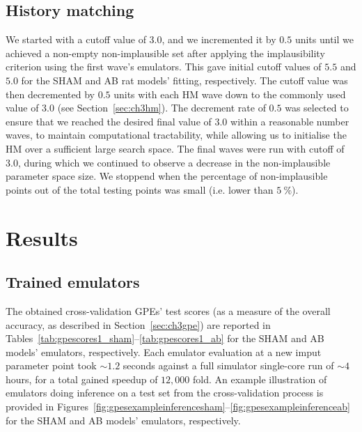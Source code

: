 \subsection{History matching}
We started with a cutoff value of $3.0$, and we incremented it by $0.5$ units until we achieved a non-empty non-implausible set after applying the implausibility criterion using the first wave's emulators. This gave initial cutoff values of $5.5$ and $5.0$ for the SHAM and AB rat models’ fitting, respectively. The cutoff value was then decremented by $0.5$ units with each HM wave down to the commonly used value of $3.0$ (see Section~\ref{sec:ch3hm}). The decrement rate of $0.5$ was selected to ensure that we reached the desired final value of $3.0$ within a reasonable number waves, to maintain computational tractability, while allowing us to initialise the HM over a sufficient large search space. The final waves were run with cutoff of $3.0$, during which we continued to observe a decrease in the non-implausible parameter space size. We stoppend when the percentage of non-implausible points out of the total testing points was small (i.e. lower than $\SI{5}{\percent}$).


%
%
%
\section{Results}\label{sec:ch4results}

%
%
%
\subsection{Trained emulators}
The obtained cross-validation GPEs' test scores (as a measure of the overall accuracy, as described in Section~\ref{sec:ch3gpe}) are reported in Tables~\ref{tab:gpescores1_sham}--\ref{tab:gpescores1_ab} for the SHAM and AB models' emulators, respectively. Each emulator evaluation at a new imput parameter point took $\sim 1.2$ seconds against a full simulator single-core run of $\sim 4$ hours, for a total gained speedup of $12,000$ fold. An example illustration of emulators doing inference on a test set from the cross-validation process is provided in Figures~\ref{fig:gpesexampleinferencesham}--\ref{fig:gpesexampleinferenceab} for the SHAM and AB models' emulators, respectively.

